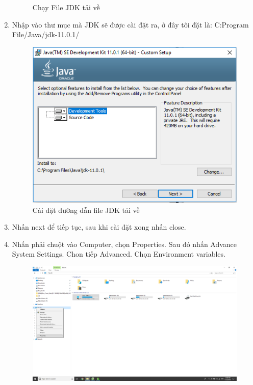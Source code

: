 \begin{enumerate}
\begin{center}
\begin{figure}[htp]
    \caption{Chạy File JDK tải về}
    \label{refhinh1}
    \end{figure}
\end{center}
    \item Nhập vào thư mục mà JDK sẽ được cài đặt ra, ở đây tôi đặt là: \textsf{C:Program File/Java/jdk-11.0.1/}
\newpage
\begin{center}
    \begin{figure}[htp]
    \begin{center}
     \includegraphics[scale=1.0]{image3/javatm}
    \end{center}
    \caption{Cài đặt đường dẫn file JDK tải về}
    \label{refhinh1}
    \end{figure}
\end{center}
    \item Nhấn next để tiếp tục, sau khi cài đặt xong nhấn close.
    \item Nhấn phải chuột vào Computer, chọn Properties. Sau đó nhấn Advance System Settings. Chon tiếp Advanced. Chọn Environment variables.
\newpage
\begin{center}
    \begin{figure}[htp]
    \begin{center}
     \includegraphics[scale=0.25]{image3/pc}

\end{center}
\end{figure}
\end{center}
\end{enumerate}
